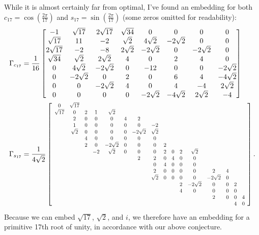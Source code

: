 \documentclass{article}
\theoremstyle{definition}
\theoremstyle{theorem}
\theoremstyle{remark}
\newcommand\scalemath[2]{\scalebox{#1}{\mbox{\ensuremath{\displaystyle #2}}}}
\begin{document}
	While it is almost certainly far from optimal, I've found an embedding for both $c_{17}=\cos\left(\frac{2\pi}{17}\right)$ and $s_{17}=\sin\left(\frac{2\pi}{17}\right)$ (some zeros omitted for readability):
	\begin{align*}
	    \Gamma_{c_{17}}&= \frac{1}{16}\begin{bmatrix}
	    -1 & \sqrt{17} & 2\sqrt{17} & \sqrt{34} & 0 & 0 & 0 & 0\\
	    \sqrt{17} & 11 & -2 & \sqrt{2} & 4\sqrt{2} & -2\sqrt{2} & 0 & 0\\
	    2\sqrt{17} & -2 & -8 & 2\sqrt{2} & -2\sqrt{2} & 0 & -2\sqrt{2} & 0\\
	    \sqrt{34} & \sqrt{2} & 2\sqrt{2} & 4 & 0 & 2 & 4 & 0\\
	    0 & 4\sqrt{2} & -2\sqrt{2} & 0 & -12 & 0 & 0 & -2\sqrt{2}\\
	    0 & -2\sqrt{2} & 0 & 2 & 0 & 6 & 4 & -4\sqrt{2} \\
	    0 & 0 & -2\sqrt{2} & 4 &0 & 4 & -4 & 2\sqrt{2}\\
	    0 & 0 & 0 & 0 & -2\sqrt{2} & -4\sqrt{2} & 2\sqrt{2} & -4
	    \end{bmatrix}\\
	    \Gamma_{s_{17}}&=\frac{1}{4\sqrt{2}}\left[\scalemath{0.75}{\begin{array}{cccccccccccccccc}
	        0 & \sqrt{17} &&&&&&&&&&&&&& \\
	        \sqrt{17} & 0 & 2 & 1 & \sqrt{2} &&&&&&&&&&& \\
	        & 2 & 0 & 0 & 0 & 4 & 2 &&&&&&&&& \\
	        & 1 & 0 & 0 & 0 & 0 & 0 & -2 &&&&&&&& \\
	        & \sqrt{2} & 0 & 0 & 0 & 0 & -2\sqrt{2} & \sqrt{2} &&&&&&&& \\
	        && 4 & 0 & 0 & 0 & 0 & 0 &&&&&&&& \\
	        && 2 & 0 & -2\sqrt{2} & 0 & 0 & 0 & 2 &&&&&&& \\
	        &&& -2 & \sqrt{2} & 0 & 0 & 0 & 2 & 0 & 2 & \sqrt{2} &&&& \\
	        &&&&&& 2 & 2 & 0 & 4 & 0 & 0 &&&& \\
	        &&&&&&& 0 & 4 & 0 & 0 & 0 &&&& \\
	        &&&&&&& 2 & 0 & 0 & 0 & 0 & 2  & 4 && \\
	        &&&&&&& \sqrt{2} & 0 & 0 & 0 & 0 & -2\sqrt{2} & 0 && \\
	        &&&&&&&&&& 2 & -2\sqrt{2} & 0 & 0 & 2 & \\
	        &&&&&&&&&& 4 & 0 & 0 & 0 & 0 & \\
	        &&&&&&&&&&&& 2 & 0 & 0 & 4 \\
	        &&&&&&&&&&&&&& 4 & 0
	    \end{array}}\right].
	\end{align*}
	Because we can embed $\sqrt{17}$, $\sqrt{2}$, and $i$, we therefore have an embedding for a primitive 17th root of unity, in accordance with our above conjecture.
	
\end{document}
